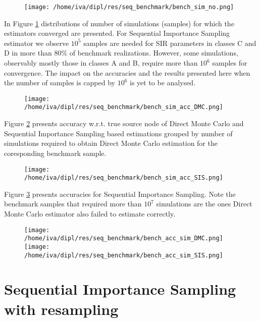 \documentclass[times, utf8, diplomski]{fer}
\begin{document}
\begin{figure}[H]
\texttt{[image: /home/iva/dipl/res/seq\_benchmark/bench\_sim\_no.png]}
\caption{}
\label{bench_sim_no}
\end{figure}
In Figure \ref{bench_sim_no} distributions of number of simulations (samples) for which the estimators converged are presented. For Sequential Importance Sampling estimator we observe $10^5$ samples are needed for SIR parameters in classes C and D in more than $80\%$ of benchmark realizations. However, some simulations, observably mostly those in classes A and B, require more than $10^6$ samples for convergence. The impact on the accuracies and the results presented here when the number of samples is capped by $10^6$ is yet to be analysed. 

\begin{figure}[H]
\texttt{[image: /home/iva/dipl/res/seq\_benchmark/bench\_sim\_acc\_DMC.png]}
\caption{}
\label{bench_sim_accDMC}
\end{figure}
Figure \ref{bench_sim_accDMC} presents accuracy w.r.t. true source node of Direct Monte Carlo and Sequential Importance Sampling based estimations grouped by number of simulations required to obtain Direct Monte Carlo estimation for the coresponding benchmark sample. 
	
\begin{figure}[H]
\texttt{[image: /home/iva/dipl/res/seq\_benchmark/bench\_sim\_acc\_SIS.png]}
\caption{}
\label{bench_sim_accSIS}
\end{figure}
Figure \ref{bench_sim_accSIS} presents accuracies for Sequential Importance Sampling. Note the benchmark samples that required more than $10^7$ simulations are the ones Direct Monte Carlo estimator also failed to estimate correctly.  

\begin{figure}
\texttt{[image: /home/iva/dipl/res/seq\_benchmark/bench\_acc\_sim\_DMC.png]}
\texttt{[image: /home/iva/dipl/res/seq\_benchmark/bench\_acc\_sim\_SIS.png]}
\caption{}
\label{bench_acc_simDMC}
\end{figure}


\section{Sequential Importance Sampling with resampling}
\end{document}
